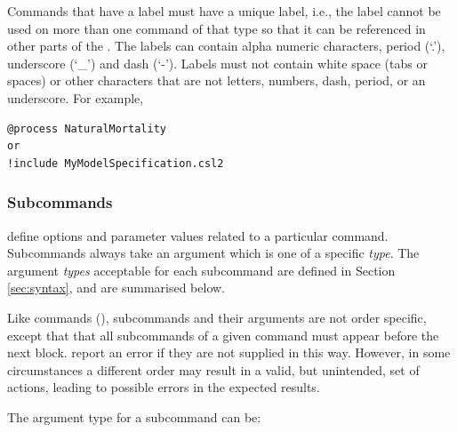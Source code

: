 Commands that have a label must have a unique label, i.e., the label cannot be used on more than one command of that type so that it can be referenced in other parts of the \config. The labels can contain alpha numeric characters, period (`.'), underscore (`\_') and dash (`-'). Labels must not contain white space (tabs or spaces) or other characters that are not letters, numbers, dash, period, or an underscore. For example,

{\small{\begin{verbatim}
@process NaturalMortality
or
!include MyModelSpecification.csl2
\end{verbatim}}}

\subsubsection{Subcommands}

\CNAME\subcommands define options and parameter values related to a particular command. Subcommands always take an argument which is one of a specific \emph{type}. The argument \emph{types} acceptable for each subcommand are defined in Section \ref{sec:syntax}, and are summarised below.

Like commands (), subcommands and their arguments are not order specific, except that that all subcommands of a given command must appear before the next  block. \CNAME\may report an error if they are not supplied in this way. However, in some circumstances a different order may result in a valid, but unintended, set of actions, leading to possible errors in the expected results.

The argument type for a subcommand can be:

